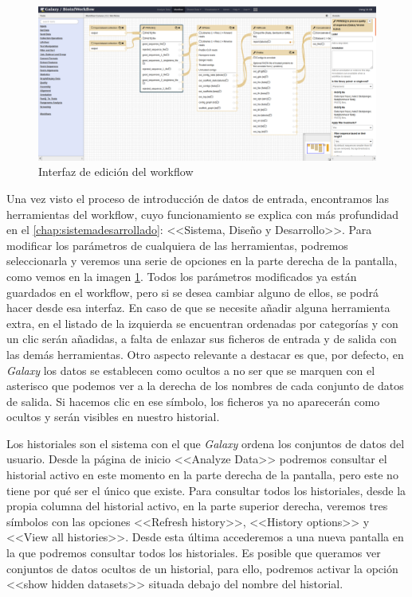\begin{figure}
    \begin{center}
      \includegraphics[scale=0.3]{images/InterfazWorkflowEdit.png}
      \caption{Interfaz de edición del workflow}
      \label{fig:WorkflowEdit}
    \end{center}
\end{figure}
Una vez visto el proceso de introducción de datos de entrada, encontramos las herramientas del workflow, cuyo funcionamiento se explica con más profundidad en el \autoref{chap:sistemadesarrollado}: <<Sistema, Diseño y Desarrollo>>. Para modificar los parámetros de cualquiera de las herramientas, podremos seleccionarla y veremos una serie de opciones en la parte derecha de la pantalla, como vemos en la imagen \ref{fig:WorkflowEdit}. Todos los parámetros modificados ya están guardados en el workflow, pero si se desea cambiar alguno de ellos, se podrá hacer desde esa interfaz. En caso de que se necesite añadir alguna herramienta extra, en el listado de la izquierda se encuentran ordenadas por categorías y con un clic serán añadidas, a falta de enlazar sus ficheros de entrada y de salida con las demás herramientas. Otro aspecto relevante a destacar es que, por defecto, en \textit{Galaxy} los datos se establecen como ocultos a no ser que se marquen con el asterisco que podemos ver a la derecha de los nombres de cada conjunto de datos de salida. Si hacemos clic en ese símbolo, los ficheros ya no aparecerán como ocultos y serán visibles en nuestro historial.

Los historiales son el sistema con el que \textit{Galaxy} ordena los conjuntos de datos del usuario. Desde la página de inicio <<Analyze Data>> podremos consultar el historial activo en este momento  en la parte derecha de la pantalla, pero este no tiene por qué ser el único que existe. Para consultar todos los historiales, desde la propia columna del historial activo, en la parte superior derecha, veremos tres símbolos con las opciones <<Refresh history>>, <<History options>> y <<View all histories>>. Desde esta última accederemos a una nueva pantalla en la que podremos consultar todos los historiales. Es posible que queramos ver conjuntos de datos ocultos de un historial, para ello, podremos activar la opción <<show hidden datasets>> situada debajo del nombre del historial.

